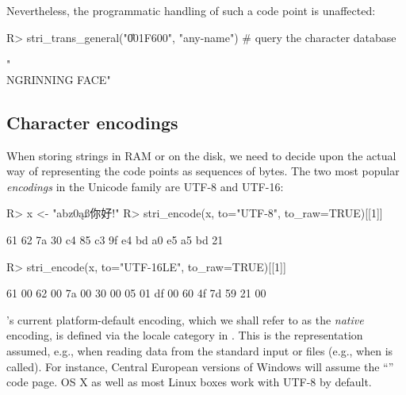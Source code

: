 \documentclass[nojss]{jss}
\begin{document}
Nevertheless, the programmatic handling of such a code point is unaffected:

\begin{Schunk}
\begin{Sinput}
R> stri_trans_general("\U001F600", "any-name") # query the character database
\end{Sinput}
\begin{Soutput}
[1] "\\N{GRINNING FACE}"
\end{Soutput}
\end{Schunk}



%
%




\subsection{Character encodings}\label{Sec:encoding}

When storing strings in RAM or on the disk,
we need to decide upon the actual way
of representing the code points as sequences of bytes.
The two most popular \textit{encodings} in the Unicode family are
UTF-8 and UTF-16:

\begin{Schunk}
\begin{Sinput}
R> x <- "abz0ąß你好!"
R> stri_encode(x, to="UTF-8", to_raw=TRUE)[[1]]
\end{Sinput}
\begin{Soutput}
 [1] 61 62 7a 30 c4 85 c3 9f e4 bd a0 e5 a5 bd 21
\end{Soutput}
\begin{Sinput}
R> stri_encode(x, to="UTF-16LE", to_raw=TRUE)[[1]]
\end{Sinput}
\begin{Soutput}
 [1] 61 00 62 00 7a 00 30 00 05 01 df 00 60 4f 7d 59 21 00
\end{Soutput}
\end{Schunk}

's current platform-default encoding, which we shall
refer to as the \textit{native} encoding, is defined via the
 locale category in
. This is the representation assumed,
e.g., when reading data from the standard input
or files (e.g., when 
is called).
For instance, Central European versions of Windows will assume
the ``'' code page.
OS X as well as most Linux boxes work with UTF-8 by default.
\end{document}

